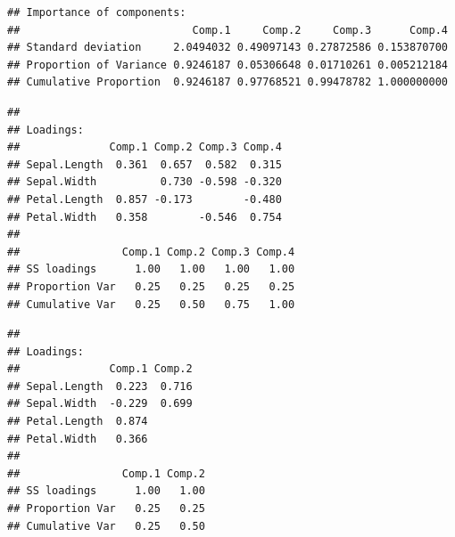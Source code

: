 \documentclass[
]{article}
\newenvironment{Shaded}{\begin{snugshade}}{\end{snugshade}}
\newcommand{\CommentTok}[1]{\textcolor[rgb]{0.56,0.35,0.01}{\textit{#1}}}
\newcommand{\DecValTok}[1]{\textcolor[rgb]{0.00,0.00,0.81}{#1}}
\newcommand{\FunctionTok}[1]{\textcolor[rgb]{0.00,0.00,0.00}{#1}}
\newcommand{\NormalTok}[1]{#1}
\newcommand{\OtherTok}[1]{\textcolor[rgb]{0.56,0.35,0.01}{#1}}
\newcommand{\SpecialCharTok}[1]{\textcolor[rgb]{0.00,0.00,0.00}{#1}}
\theoremstyle{definition}
\theoremstyle{definition}
\theoremstyle{definition}
\theoremstyle{definition}
\theoremstyle{remark}
\begin{document}
\begin{verbatim}
## Importance of components:
##                           Comp.1     Comp.2     Comp.3      Comp.4
## Standard deviation     2.0494032 0.49097143 0.27872586 0.153870700
## Proportion of Variance 0.9246187 0.05306648 0.01710261 0.005212184
## Cumulative Proportion  0.9246187 0.97768521 0.99478782 1.000000000
\end{verbatim}

\begin{Shaded}
\end{Shaded}

\begin{verbatim}
## 
## Loadings:
##              Comp.1 Comp.2 Comp.3 Comp.4
## Sepal.Length  0.361  0.657  0.582  0.315
## Sepal.Width          0.730 -0.598 -0.320
## Petal.Length  0.857 -0.173        -0.480
## Petal.Width   0.358        -0.546  0.754
## 
##                Comp.1 Comp.2 Comp.3 Comp.4
## SS loadings      1.00   1.00   1.00   1.00
## Proportion Var   0.25   0.25   0.25   0.25
## Cumulative Var   0.25   0.50   0.75   1.00
\end{verbatim}

\begin{Shaded}
\end{Shaded}

\begin{verbatim}
## 
## Loadings:
##              Comp.1 Comp.2
## Sepal.Length  0.223  0.716
## Sepal.Width  -0.229  0.699
## Petal.Length  0.874       
## Petal.Width   0.366       
## 
##                Comp.1 Comp.2
## SS loadings      1.00   1.00
## Proportion Var   0.25   0.25
## Cumulative Var   0.25   0.50
\end{verbatim}
\end{document}
